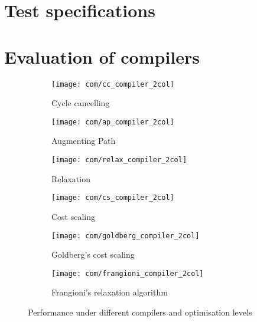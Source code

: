 \section{Test specifications} \label{appendix:test-machine-spec}

\section{Evaluation of compilers} \label{appendix:test-compilers}

\begin{figure}
    \begin{widepage}
    \begin{subfigure}[c]{0.5\textwidth}
        \texttt{[image: com/cc\_compiler\_2col]}
        \caption{Cycle cancelling}
    \end{subfigure}
    \begin{subfigure}[c]{0.5\textwidth}
        \texttt{[image: com/ap\_compiler\_2col]}
        \caption{Augmenting Path}
    \end{subfigure}
    \begin{subfigure}[c]{0.5\textwidth}
        \texttt{[image: com/relax\_compiler\_2col]}
        \caption{Relaxation}
    \end{subfigure}
    \begin{subfigure}[c]{0.5\textwidth}
        \texttt{[image: com/cs\_compiler\_2col]}
        \caption{Cost scaling}
    \end{subfigure}
    \begin{subfigure}[c]{0.5\textwidth}
        \texttt{[image: com/goldberg\_compiler\_2col]}
        \caption{Goldberg's cost scaling}
    \end{subfigure}
    \begin{subfigure}[c]{0.5\textwidth}
        \texttt{[image: com/frangioni\_compiler\_2col]}
        \caption{Frangioni's relaxation algorithm}
    \end{subfigure}
    \end{widepage}
    \caption{Performance under different compilers and optimisation levels}
    \label{fig:compilers}
\end{figure}